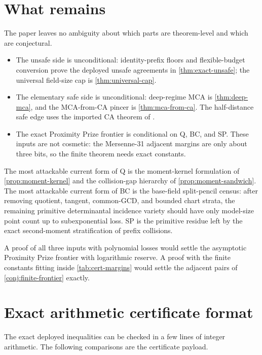 \documentclass[11pt]{article}
\theoremstyle{definition}
\theoremstyle{remark}
\begin{document}
\section{What remains}\label{sec:remaining}

The paper leaves no ambiguity about which parts are theorem-level and which are conjectural.

\begin{itemize}[leftmargin=2em]
\item The unsafe side is unconditional: identity-prefix floors and flexible-budget conversion prove the deployed unsafe agreements in \cref{thm:exact-unsafe}; the universal field-size cap is \cref{thm:universal-cap}.
\item The elementary safe side is unconditional: deep-regime MCA is \cref{thm:deep-mca}, and the MCA-from-CA pincer is \cref{thm:mca-from-ca}.  The half-distance safe edge uses the imported CA theorem of \cite{BCIKS20}.
\item The exact Proximity Prize frontier is conditional on Q, BC, and SP.  These inputs are not cosmetic: the Mersenne-31 adjacent margins are only about three bits, so the finite theorem needs exact constants.
\end{itemize}

The most attackable current form of Q is the moment-kernel formulation of \cref{prop:moment-kernel} and the collision-gap hierarchy of \cref{prop:moment-sandwich}.  The most attackable current form of BC is the base-field split-pencil census: after removing quotient, tangent, common-GCD, and bounded chart strata, the remaining primitive determinantal incidence variety should have only model-size point count up to subexponential loss.  SP is the primitive residue left by the exact second-moment stratification of prefix collisions.

A proof of all three inputs with polynomial losses would settle the asymptotic Proximity Prize frontier with logarithmic reserve.  A proof with the finite constants fitting inside \cref{tab:cert-margins} would settle the adjacent pairs of \cref{conj:finite-frontier} exactly.

\appendix

\section{Exact arithmetic certificate format}\label{app:cert}

The exact deployed inequalities can be checked in a few lines of integer arithmetic.  The following comparisons are the certificate payload.
\end{document}
